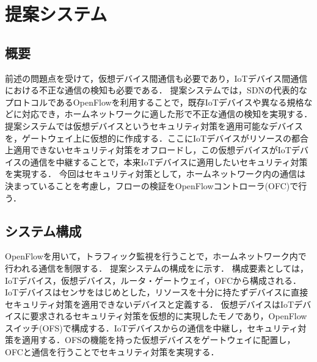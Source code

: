 \documentclass[a4paper,10pt,twocolumn,uplatex]{jsarticle}
\begin{document}

\section{提案システム}
\subsection{概要}
前述の問題点を受けて，仮想デバイス間通信も必要であり，IoTデバイス間通信における不正な通信の検知も必要である．
提案システムでは，SDNの代表的なプロトコルであるOpenFlowを利用することで，既存IoTデバイスや異なる規格などに対応でき，ホームネットワークに適した形で不正な通信の検知を実現する．
提案システムでは仮想デバイスというセキュリティ対策を適用可能なデバイスを，ゲートウェイ上に仮想的に作成する．ここにIoTデバイスがリソースの都合上適用できないセキュリティ対策をオフロードし，この仮想デバイスがIoTデバイスの通信を中継することで，本来IoTデバイスに適用したいセキュリティ対策を実現する．
今回はセキュリティ対策として，ホームネットワーク内の通信は決まっていることを考慮し，フローの検証をOpenFlowコントローラ(OFC)で行う．


\subsection{システム構成}
OpenFlowを用いて，トラフィック監視を行うことで，ホームネットワーク内で行われる通信を制限する．
提案システムの構成をに示す．
構成要素としては，IoTデバイス，仮想デバイス，ルータ・ゲートウェイ，OFCから構成される．
IoTデバイスはセンサをはじめとした，リソースを十分に持たずデバイスに直接セキュリティ対策を適用できないデバイスと定義する．
仮想デバイスはIoTデバイスに要求されるセキュリティ対策を仮想的に実現したモノであり，OpenFlowスイッチ(OFS)で構成する．IoTデバイスからの通信を中継し，セキュリティ対策を適用する．OFSの機能を持った仮想デバイスをゲートウェイに配置し，OFCと通信を行うことでセキュリティ対策を実現する．
\end{document}

